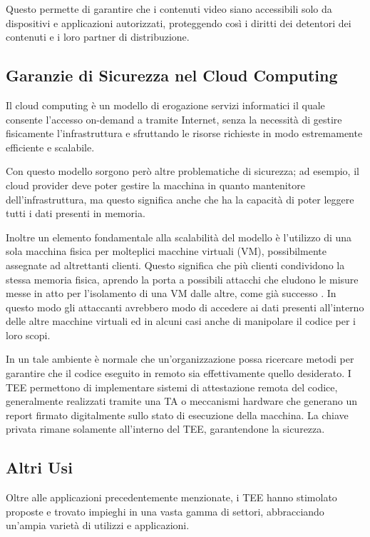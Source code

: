 \documentclass[12pt,italian]{report}
\begin{document}
	Questo permette di garantire che i contenuti video siano accessibili solo da dispositivi e applicazioni autorizzati, proteggendo così i diritti dei detentori dei contenuti e i loro partner di distribuzione. 
	
	\subsection{Garanzie di Sicurezza nel Cloud Computing}
	\label{subsec:protezione-cloud}
	Il cloud computing è un modello di erogazione servizi informatici il quale consente l'accesso on-demand a tramite Internet, senza la necessità di gestire fisicamente l'infrastruttura e sfruttando le risorse richieste in modo estremamente efficiente e scalabile.
	
	Con questo modello sorgono però altre problematiche di sicurezza; ad esempio, il cloud provider deve poter gestire la macchina in quanto mantenitore dell'infrastruttura, ma questo significa anche che ha la capacità di poter leggere tutti i dati presenti in memoria.
	
	Inoltre un elemento fondamentale alla scalabilità del modello è l'utilizzo di una sola macchina fisica per molteplici macchine virtuali (VM), possibilmente assegnate ad altrettanti clienti. Questo significa che più clienti condividono la stessa memoria fisica, aprendo la porta a possibili attacchi che eludono le misure messe in atto per l'isolamento di una VM dalle altre, come già successo \cite{vmescape1} \cite{vmescape2} \cite{vmescape3}. In questo modo gli attaccanti avrebbero modo di accedere ai dati presenti all'interno delle altre macchine virtuali ed in alcuni casi anche di manipolare il codice per i loro scopi.
	
	\bigbreak
	
	In un tale ambiente è normale che un'organizzazione possa ricercare metodi per garantire che il codice eseguito in remoto sia effettivamente quello desiderato. I TEE permettono di implementare sistemi di attestazione remota del codice, generalmente realizzati tramite una TA o meccanismi hardware che generano un report firmato digitalmente sullo stato di esecuzione della macchina. La chiave privata rimane solamente all'interno del TEE, garantendone la sicurezza.
	
	\subsection{Altri Usi}
	\label{subsec:altri-usi}
	Oltre alle applicazioni precedentemente menzionate, i TEE hanno stimolato proposte e trovato impieghi in una vasta gamma di settori, abbracciando un'ampia varietà di utilizzi e applicazioni.
	
\end{document}
